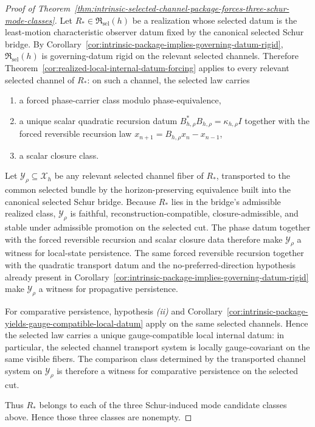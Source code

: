 \begin{proof}[Proof of Theorem~\ref{thm:intrinsic-selected-channel-package-forces-three-schur-mode-classes}]
\label{proof:thm:intrinsic-selected-channel-package-forces-three-schur-mode-classes}
Let \(R_\ast\in\mathfrak R_{\mathrm{sel}}(h)\) be a realization whose selected
datum is the least-motion characteristic observer datum fixed by the canonical
selected Schur bridge. By
Corollary~\ref{cor:intrinsic-package-implies-governing-datum-rigid},
\(\mathfrak R_{\mathrm{sel}}(h)\) is governing-datum rigid on the relevant
selected channels. Therefore
Theorem~\ref{cor:realized-local-internal-datum-forcing} applies to every
relevant selected channel of \(R_\ast\): on such a channel, the selected law
carries
\begin{enumerate}[label=(\roman*), leftmargin=2em, itemsep=0.2em]
\item a forced phase-carrier class modulo phase-equivalence,
\item a unique scalar quadratic recursion datum
      \(B_{h,\rho}^\ast B_{h,\rho}=\kappa_{h,\rho}I\) together with the forced
      reversible recursion law
      \(x_{n+1}=B_{h,\rho}x_n-x_{n-1}\),
\item a scalar closure class.
\end{enumerate}

Let \(\mathcal Y_\rho\subseteq \mathcal X_h\) be any relevant selected channel
fiber of \(R_\ast\), transported to the common selected bundle by the
horizon-preserving equivalence built into the canonical selected Schur bridge.
Because \(R_\ast\) lies in the bridge's admissible realized class,
\(\mathcal Y_\rho\) is faithful, reconstruction-compatible,
closure-admissible, and stable under admissible promotion on the selected cut.
The phase datum together with the forced reversible recursion and scalar
closure data therefore make \(\mathcal Y_\rho\) a witness for
local-state persistence. The same forced reversible recursion together with the
quadratic transport datum and the no-preferred-direction hypothesis already
present in
Corollary~\ref{cor:intrinsic-package-implies-governing-datum-rigid} make
\(\mathcal Y_\rho\) a witness for propagative persistence.

For comparative persistence, hypothesis \emph{(ii)} and
Corollary~\ref{cor:intrinsic-package-yields-gauge-compatible-local-datum}
apply on the same selected channels. Hence the selected law carries a unique
gauge-compatible local internal datum: in particular, the selected channel
transport system is locally gauge-covariant on the same visible fibers. The
comparison class determined by the transported channel system on
\(\mathcal Y_\rho\) is therefore a witness for comparative persistence on the
selected cut.

Thus \(R_\ast\) belongs to each of the three Schur-induced mode candidate
classes above. Hence those three classes are nonempty.
\end{proof}

